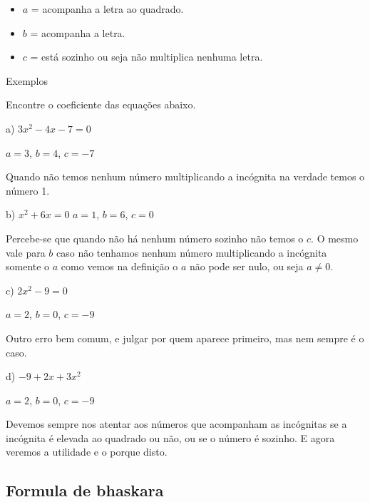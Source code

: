 \documentclass[letterpaper]{book}
\begin{document}
\begin{itemize}
\item \(a\) = acompanha a letra ao quadrado.
\item \(b\) = acompanha a letra.
\item \(c\) = está sozinho ou seja não multiplica nenhuma letra.
\end{itemize}

Exemplos

\vspace{0.5em}

Encontre o coeficiente das equações abaixo.

\vspace{0.5em}

a) \(3x^{2} - 4x -7 = 0\)

\(a = 3\), $b = 4$, $c = -7$

\vspace{0.5em}

Quando não temos nenhum número multiplicando a incógnita na verdade temos o número 1.

\vspace{0.5em}

b) \(x^{2} + 6x = 0\)
\(a = 1\), $b = 6$, $c = 0$

Percebe-se que quando não há nenhum número sozinho não temos o \(c\). O mesmo vale para \(b\) caso não tenhamos nenhum número multiplicando a incógnita somente o \(a\) como vemos na definição o \(a\) não pode ser nulo, ou seja \(a \neq 0\).

c) \(2x^{2} - 9 = 0\)

\(a = 2\), $b = 0$, $c = -9$

\vspace{0.5em}

Outro erro bem comum, e julgar por quem aparece primeiro, mas nem sempre é o caso.

\vspace{0.5em}

d) \(-9 + 2x + 3x^{2}\)

\(a = 2\), $b = 0$, $c = -9$

\vspace{0.5em}

Devemos sempre nos atentar aos números que acompanham as incógnitas se a incógnita é elevada ao quadrado ou não, ou se o número é sozinho. E agora veremos a utilidade e o porque disto.

\subsection{Formula de bhaskara}
\end{document}
